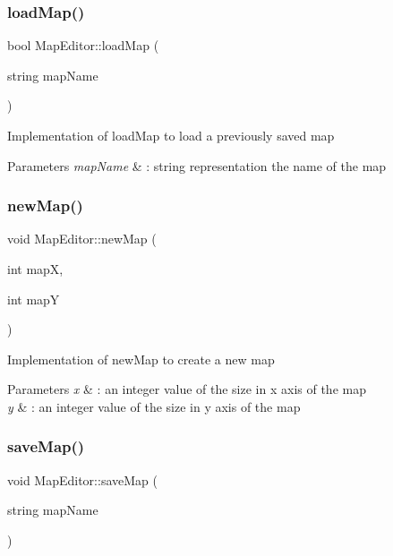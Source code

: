 \subsubsection{\texorpdfstring{load\+Map()}{loadMap()}}
{\footnotesize\ttfamily bool Map\+Editor\+::load\+Map (\begin{DoxyParamCaption}\item[{string}]{map\+Name }\end{DoxyParamCaption})}

Implementation of load\+Map to load a previously saved map 
\begin{DoxyParams}{Parameters}
{\em map\+Name} & \+: string representation the name of the map \\
\hline
\end{DoxyParams}
\hypertarget{class_map_editor_a57870586b534b4fe8057d629ee367651}{}\label{class_map_editor_a57870586b534b4fe8057d629ee367651} 
\subsubsection{\texorpdfstring{new\+Map()}{newMap()}}
{\footnotesize\ttfamily void Map\+Editor\+::new\+Map (\begin{DoxyParamCaption}\item[{int}]{mapX,  }\item[{int}]{mapY }\end{DoxyParamCaption})}

Implementation of new\+Map to create a new map 
\begin{DoxyParams}{Parameters}
{\em x} & \+: an integer value of the size in x axis of the map \\
\hline
{\em y} & \+: an integer value of the size in y axis of the map \\
\hline
\end{DoxyParams}
\hypertarget{class_map_editor_ac1e3e9bab1f285d9055b6cc610fa9114}{}\label{class_map_editor_ac1e3e9bab1f285d9055b6cc610fa9114} 
\subsubsection{\texorpdfstring{save\+Map()}{saveMap()}}
{\footnotesize\ttfamily void Map\+Editor\+::save\+Map (\begin{DoxyParamCaption}\item[{string}]{map\+Name }\end{DoxyParamCaption})}

